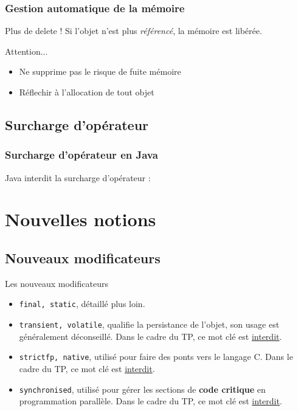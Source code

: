 \documentclass[handout]{beamer}
\begin{document}
\begin{frame}
	\frametitle{Gestion automatique de la mémoire}
	\begin{block}{Plus de delete !}
		Si l'objet n'est plus \textit{référencé}, la mémoire est libérée. 
	\end{block}
	\begin{block}{Attention...}
		\begin{center}
			\begin{itemize}
				\item Ne supprime pas le risque de fuite mémoire
				\item Réflechir à l'allocation de tout objet
			\end{itemize}
		\end{center}	
	\end{block}
\end{frame}

\subsection{Surcharge d'opérateur}

\begin{frame}
	\frametitle{Surcharge d'opérateur en Java}
	\begin{block}{Java interdit la surcharge d'opérateur :}
		
	\end{block}

\end{frame}

\section{Nouvelles notions}

\subsection{Nouveaux modificateurs}
\begin{frame}
	\begin{block}{Les nouveaux modificateurs}
		\begin{itemize}
			\item \texttt{final, static}, détaillé plus loin.
			\item \texttt{transient, volatile}, qualifie la persistance de l'objet, son usage est  généralement déconseillé. Dans le cadre du TP, ce mot clé est \underline{interdit}.
			\item \texttt{strictfp, native}, utilisé pour faire des ponts vers le langage C. Dans le cadre du TP, ce mot clé est \underline{interdit}.
			\item \texttt{synchronised}, utilisé pour gérer les sections de \textbf{code critique} en programmation parallèle. Dans le cadre du TP, ce mot clé est \underline{interdit}.
		\end{itemize}
	\end{block}
	
\end{frame}
\end{document}
